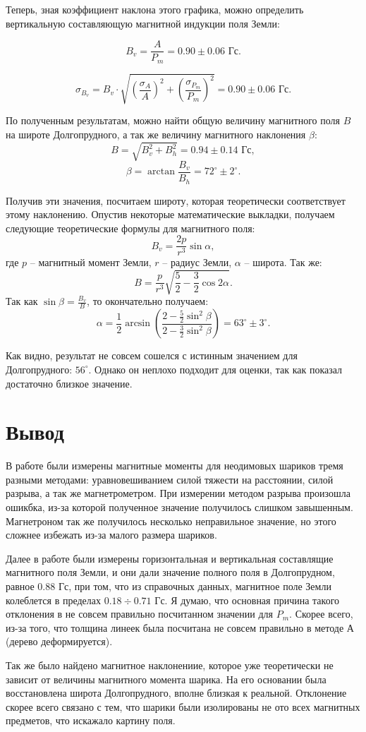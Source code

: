 \documentclass[a4paper, 14pt]{extarticle}%
\begin{document}
Теперь, зная коэффициент наклона этого графика, можно определить вертикальную составляющую магнитной индукции поля Земли:

\[B_v = \frac{A}{P_m} = 0.90\pm0.06 \text{ Гс}.\]

\[\sigma_{B_v} = B_v\cdot \sqrt{\left(\frac{\sigma_A}{A}\right)^2  +  \left(\frac{\sigma_{P_m}}{P_m}\right)^2} = 0.90\pm0.06 \text{ Гс}.\]

По полученным результатам, можно найти общую величину магнитного поля $B$ на широте Долгопрудного, а так же величину магнитного наклонения $\beta$:
\[B = \sqrt{B_v^2+B_h^2} = 0.94\pm 0.14\text{ Гс},\]
\[\beta = \arctan\frac{B_v}{B_h} = 72^{\circ}\pm2^{\circ}.\]

Получив эти значения, посчитаем широту, которая теоретически соответствует этому наклонению. Опустив некоторые математические выкладки, получаем следующие теоретические формулы для магнитного поля:
\[B_v = \frac{2p}{r^3}\sin\alpha,\]
где $p$ -- магнитный момент Земли, $r$ -- радиус Земли, $\alpha$  -- широта. Так же:
\[B = \frac{p}{r^3}\sqrt{\frac{5}{2} - \frac{3}{2}\cos2\alpha}.\]
Так как
$\sin\beta = \frac{B_v}{B}$, то окончательно получаем:
\[\alpha = \frac{1}{2}\arcsin\left( \dfrac{2 - \frac{5}{2}\sin^2\beta}{2 - \frac{3}{2}\sin^2\beta}\right)  = 63^{\circ}\pm3^{\circ}.\]

Как видно, результат не совсем сошелся с истинным значением для Долгопрудного: $56^{\circ}$. Однако он неплохо подходит для оценки, так как показал достаточно близкое значение. 
\section{Вывод}
В работе были измерены магнитные моменты для неодимовых шариков тремя разными методами: уравновешиванием силой тяжести на расстоянии, силой разрыва, а так же магнетрометром. При измерении методом разрыва произошла ошикбка, из-за которой полученное значение получилось слишком завышенным. Магнетроном так же получилось несколько неправильное значение, но этого сложнее избежать из-за малого размера шариков. 

Далее в работе были измерены горизонтальная и вертикальная составлящие магнитного поля Земли, и они дали значение полного поля в Долгопрудном, равное 0.88 Гс, при том, что из справочных данных, магнитное поле Земли колеблется в пределах $0.18\div0.71$ Гс. Я думаю, что основная причина такого отклонения в не совсем правильно посчитанном значении для $P_m$. Скорее всего, из-за того, что толщина линеек была посчитана не совсем правильно в методе А (дерево деформируется).

Так же было найдено магнитное наклонениие, которое уже теоретически не зависит от величины магнитного момента шарика. На его основании была восстановлена широта Долгопрудного, вполне близкая к реальной. Отклонение скорее всего связано с тем, что шарики были изолированы не ото всех магнитных предметов, что искажало картину поля.
\end{document}

